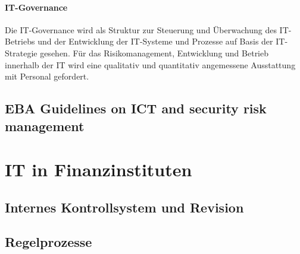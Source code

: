 \paragraph{IT-Governance} Die IT-Governance wird als Struktur zur Steuerung und Überwachung des IT-Betriebs und der Entwicklung der IT-Systeme und Prozesse auf Basis der IT-Strategie \cite{BAIT:2018} gesehen. Für das Risikomanagement, Entwicklung und Betrieb innerhalb der IT wird eine qualitativ und quantitativ angemessene Ausstattung mit Personal gefordert.



\subsection{EBA Guidelines on ICT and security risk management}




\section{IT in Finanzinstituten}

\subsection{Internes Kontrollsystem und Revision}

\subsection{Regelprozesse}
